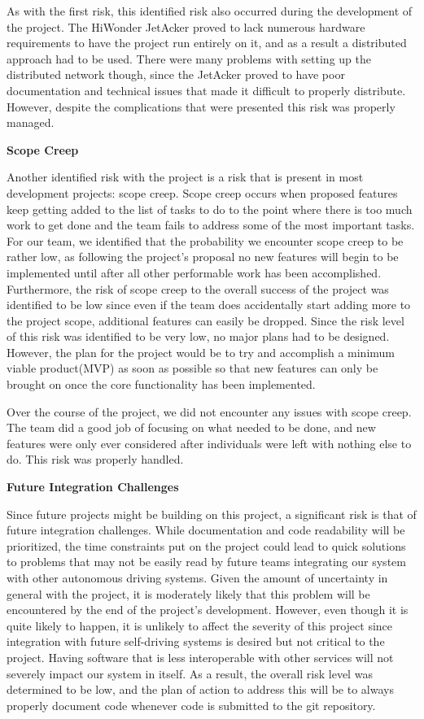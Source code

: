 \documentclass[titlepage,draft]{article}
\begin{document}
As with the first risk, this identified risk also occurred during the development of the project. The HiWonder JetAcker proved to lack numerous hardware requirements to have the project run entirely on it, and as a result a distributed approach had to be used. There were many problems with setting up the distributed network though, since the JetAcker proved to have poor documentation and technical issues that made it difficult to properly distribute. However, despite the complications that were presented this risk was properly managed.

\textbf{Scope Creep}

Another identified risk with the project is a risk that is present in most development projects: scope creep. Scope creep occurs when proposed features keep getting added to the list of tasks to do to the point where there is too much work to get done and the team fails to address some of the most important tasks. For our team, we identified that the probability we encounter scope creep to be rather low, as following the project's proposal no new features will begin to be implemented until after all other performable work has been accomplished. Furthermore, the risk of scope creep to the overall success of the project was identified to be low since even if the team does accidentally start adding more to the project scope, additional features can easily be dropped. Since the risk level of this risk was identified to be very low, no major plans had to be designed. However, the plan for the project would be to try and accomplish a minimum viable product(MVP) as soon as possible so that new features can only be brought on once the core functionality has been implemented.

Over the course of the project, we did not encounter any issues with scope creep. The team did a good job of focusing on what needed to be done, and new features were only ever considered after individuals were left with nothing else to do. This risk was properly handled.

\textbf{Future Integration Challenges}

Since future projects might be building on this project, a significant risk is that of future integration challenges. While documentation and code readability will be prioritized, the time constraints put on the project could lead to quick solutions to problems that may not be easily read by future teams integrating our system with other autonomous driving systems. Given the amount of uncertainty in general with the project, it is moderately likely that this problem will be encountered by the end of the project's development. However, even though it is quite likely to happen, it is unlikely to affect the severity of this project since integration with future self-driving systems is desired but not critical to the project. Having software that is less interoperable with other services will not severely impact our system in itself. As a result, the overall risk level was determined to be low, and the plan of action to address this will be to always properly document code whenever code is submitted to the git repository.
\end{document}
